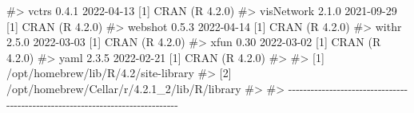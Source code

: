 \documentclass[
  11pt,
  letterpaper,
  DIV=11,
  numbers=noendperiod]{scrartcl}
\newenvironment{Shaded}{}{}
\newcommand{\CommentTok}[1]{\textcolor[rgb]{0.42,0.45,0.49}{#1}}
\begin{document}
\begin{Shaded}
\begin{Highlighting}[]
\CommentTok{\#\textgreater{}  vctrs         0.4.1     2022{-}04{-}13 [1] CRAN (R 4.2.0)}
\CommentTok{\#\textgreater{}  visNetwork    2.1.0     2021{-}09{-}29 [1] CRAN (R 4.2.0)}
\CommentTok{\#\textgreater{}  webshot       0.5.3     2022{-}04{-}14 [1] CRAN (R 4.2.0)}
\CommentTok{\#\textgreater{}  withr         2.5.0     2022{-}03{-}03 [1] CRAN (R 4.2.0)}
\CommentTok{\#\textgreater{}  xfun          0.30      2022{-}03{-}02 [1] CRAN (R 4.2.0)}
\CommentTok{\#\textgreater{}  yaml          2.3.5     2022{-}02{-}21 [1] CRAN (R 4.2.0)}
\CommentTok{\#\textgreater{} }
\CommentTok{\#\textgreater{}  [1] /opt/homebrew/lib/R/4.2/site{-}library}
\CommentTok{\#\textgreater{}  [2] /opt/homebrew/Cellar/r/4.2.1\_2/lib/R/library}
\CommentTok{\#\textgreater{} }
\CommentTok{\#\textgreater{} {-}{-}{-}{-}{-}{-}{-}{-}{-}{-}{-}{-}{-}{-}{-}{-}{-}{-}{-}{-}{-}{-}{-}{-}{-}{-}{-}{-}{-}{-}{-}{-}{-}{-}{-}{-}{-}{-}{-}{-}{-}{-}{-}{-}{-}{-}{-}{-}{-}{-}{-}{-}{-}{-}{-}{-}{-}{-}{-}{-}{-}{-}{-}{-}{-}{-}{-}{-}{-}{-}{-}{-}{-}{-}{-}{-}{-}{-}}
\end{Highlighting}
\end{Shaded}
\end{document}
